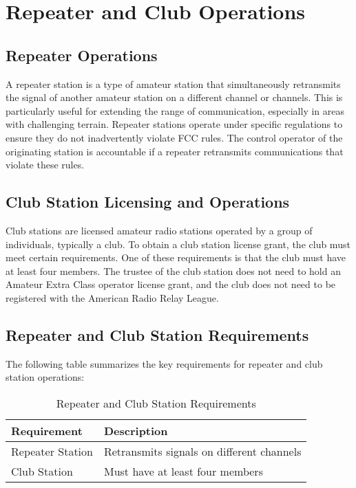 \section{Repeater and Club Operations}
\label{sec:repeater_club}

\subsection*{Repeater Operations}
A repeater station is a type of amateur station that simultaneously retransmits the signal of another amateur station on a different channel or channels. This is particularly useful for extending the range of communication, especially in areas with challenging terrain. Repeater stations operate under specific regulations to ensure they do not inadvertently violate FCC rules. The control operator of the originating station is accountable if a repeater retransmits communications that violate these rules.

\subsection*{Club Station Licensing and Operations}
Club stations are licensed amateur radio stations operated by a group of individuals, typically a club. To obtain a club station license grant, the club must meet certain requirements. One of these requirements is that the club must have at least four members. The trustee of the club station does not need to hold an Amateur Extra Class operator license grant, and the club does not need to be registered with the American Radio Relay League.

\subsection*{Repeater and Club Station Requirements}
The following table summarizes the key requirements for repeater and club station operations:

\begin{table}[h!]
\centering
\caption{Repeater and Club Station Requirements}
\label{tab:repeater_club_reqs}
\begin{tabular}{|l|l|}
\hline
\textbf{Requirement} & \textbf{Description} \\
\hline
Repeater Station & Retransmits signals on different channels \\
Club Station & Must have at least four members \\
\hline
\end{tabular}
\end{table}

